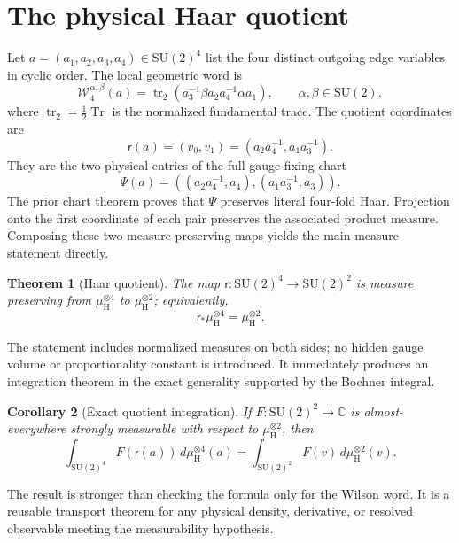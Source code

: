 \documentclass[11pt]{article}
\newtheorem{theorem}{Theorem}[section]
\newtheorem{corollary}[theorem]{Corollary}
\theoremstyle{definition}
\newcommand{\SU}{\mathrm{SU}(2)}
\newcommand{\C}{\mathbb C}
\newcommand{\Haar}{\mu_{\mathrm H}}
\newcommand{\trn}{\operatorname{tr}_2}
\newcommand{\red}{\mathsf r}
\newcommand{\W}{\mathcal W}
\begin{document}
\section{The physical Haar quotient}

Let $a=(a_1,a_2,a_3,a_4)\in\SU^4$ list the four distinct outgoing edge
variables in cyclic order.  The local geometric word is
\begin{equation}\label{eq:word4}
 \W_4^{\alpha,\beta}(a)
   =\trn(a_3^{-1}\beta a_2a_4^{-1}\alpha a_1),
 \qquad \alpha,\beta\in\SU,
\end{equation}
where $\trn=\frac12\operatorname{Tr}$ is the normalized fundamental trace.
The quotient coordinates are
\begin{equation}\label{eq:red}
 \red(a)=(v_0,v_1)=(a_2a_4^{-1},a_1a_3^{-1}).
\end{equation}
They are the two physical entries of the full gauge-fixing chart
\begin{equation}\label{eq:fullchart}
 \Psi(a)=((a_2a_4^{-1},a_4),(a_1a_3^{-1},a_3)).
\end{equation}
The prior chart theorem proves that $\Psi$ preserves literal four-fold Haar.
Projection onto the first coordinate of each pair preserves the associated
product measure.  Composing these two measure-preserving maps yields the main
measure statement directly.

\begin{theorem}[Haar quotient]\label{thm:haar}
The map $\red:\SU^4\to\SU^2$ is measure preserving from
$\Haar^{\otimes4}$ to $\Haar^{\otimes2}$; equivalently,
\[
 \red_*\Haar^{\otimes4}=\Haar^{\otimes2}.
\]
\end{theorem}

The statement includes normalized measures on both sides; no hidden gauge
volume or proportionality constant is introduced.  It immediately produces
an integration theorem in the exact generality supported by the Bochner
integral.

\begin{corollary}[Exact quotient integration]\label{cor:integral}
If $F:\SU^2\to\C$ is almost-everywhere strongly measurable with respect to
$\Haar^{\otimes2}$, then
\begin{equation}\label{eq:integralquot}
 \int_{\SU^4}F(\red(a))\,d\Haar^{\otimes4}(a)
 =\int_{\SU^2}F(v)\,d\Haar^{\otimes2}(v).
\end{equation}
\end{corollary}

The result is stronger than checking the formula only for the Wilson word.
It is a reusable transport theorem for any physical density, derivative, or
resolved observable meeting the measurability hypothesis.
\end{document}
